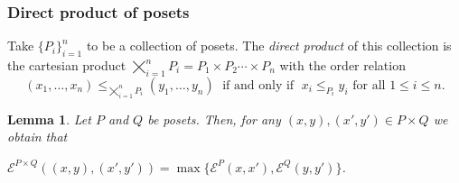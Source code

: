 \documentclass{article}[12pt]
\theoremstyle{exampstyle}
\newtheorem{lemma}[theorem]{Lemma}
\theoremstyle{remark}
\newcommand{\E}{\mathcal{E}}
\newcommand{\tuple}[3][1]{#2_{#1}, \dots , #2_{#3}}
\begin{document}
\subsubsection*{Direct product of posets}

Take $\{P_i\}_{i=1}^n$ to be a collection of posets. The \textit{direct product} of this collection is the cartesian product  \mbox{$ \displaystyle \bigtimes_{i=1}^n P_i =  P_1 \times P_2 \cdots \times P_{n}$} with the order relation 
\begin{equation*}
    (\tuple{x}{n}) \leq_{\bigtimes_{i=1}^n P_i} (\tuple{y}{n}) \; \text{ if and only if } \; x_i \leq_{P_i} y_i\text{ for all } 1 \leq i \leq n.
\end{equation*}

\begin{lemma}
    Let $P$ and $Q$ be posets. Then, for any $(x,y), (x',y') \in P \times Q$ we obtain that 
    \begin{center}
        $\E^{P \times Q}((x,y), (x',y')) = \max\{ \E^P(x,x') , \E^Q(y,y')\}$.
    \end{center}
    \label{lemma:E_direct_product_of_2}
\end{lemma}
\end{document}
